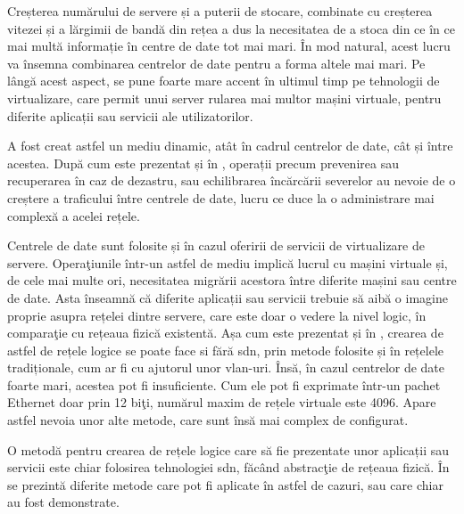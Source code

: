 Creșterea numărului de servere și a puterii de stocare, combinate cu creșterea vitezei și a lărgimii de bandă din rețea a dus la necesitatea de a stoca din ce în ce mai multă informație în centre de date tot mai mari. În mod natural, acest lucru va însemna combinarea centrelor de date pentru a forma altele mai mari. Pe lângă acest aspect, se pune foarte mare accent în ultimul timp pe tehnologii de virtualizare, care permit unui server rularea mai multor mașini virtuale, pentru diferite aplicații sau servicii ale utilizatorilor.

A fost creat astfel un mediu dinamic, atât în cadrul centrelor de date, cât și între acestea. După cum este prezentat și în \cite{onf_openflow_backbone2012}, operații precum prevenirea sau recuperarea în caz de dezastru, sau echilibrarea încărcării severelor au nevoie de o creștere a traficului între centrele de date, lucru ce duce la o administrare mai complexă a acelei rețele.

Centrele de date sunt folosite și în cazul oferirii de servicii de virtualizare de servere. Operaţiunile într-un astfel de mediu implică lucrul cu mașini virtuale și, de cele mai multe ori, necesitatea migrării acestora între diferite mașini sau centre de date. Asta înseamnă că diferite aplicații sau servicii trebuie să aibă o imagine proprie asupra rețelei dintre servere, care este doar o vedere la nivel logic, în comparaţie cu rețeaua fizică existentă. Așa cum este prezentat și în \cite{nadeau2013sdn}, crearea de astfel de rețele logice se poate face si fără \gls{sdn}, prin metode folosite și în rețelele tradiționale, cum ar fi cu ajutorul unor \gls{vlan}-uri. Însă, în cazul centrelor de date foarte mari, acestea pot fi insuficiente. Cum ele pot fi exprimate într-un pachet Ethernet doar prin 12 biţi, numărul maxim de rețele virtuale este 4096. Apare astfel nevoia unor alte metode, care sunt însă mai complex de configurat.

O metodă pentru crearea de rețele logice care să fie prezentate unor aplicații sau servicii este chiar folosirea tehnologiei \gls{sdn}, făcând abstracţie de rețeaua fizică. În \cite{onf_openflow_backbone2012, onf_sdn_datacenter2013, liu2014sdn, munoz2015integrated} se prezintă diferite metode care pot fi aplicate în astfel de cazuri, sau care chiar au fost demonstrate.


